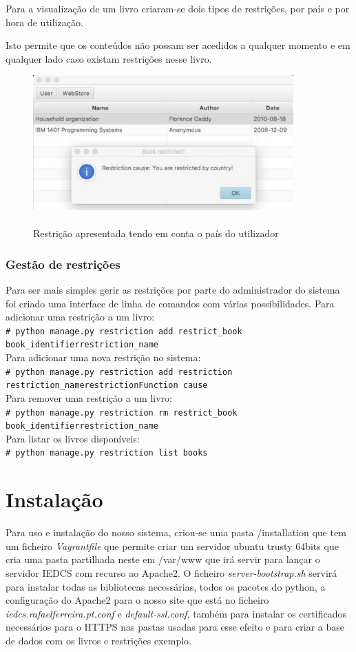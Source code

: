 \documentclass[pdftex,12pt,a4paper]{report}
\newcommand{\shellcmd}[1]{\\\indent\indent\texttt{\footnotesize\# #1}\\}
\begin{document}
Para a visualização de um livro criaram-se dois tipos de restrições, por país e por hora de utilização.

Isto permite que os conteúdos não possam ser acedidos a qualquer momento e em qualquer lado caso existam restrições nesse livro.

\begin{figure}[!htb]
\center
 \includegraphics[width=100mm,scale=1]{country_restriction.pdf}
 \caption{\\Restrição apresentada tendo em conta o país do utilizador}
 \label{fig:eer}
\end{figure}

\subsubsection{Gestão de restrições}

Para ser mais simples gerir as restrições por parte do administrador do sistema foi criado uma interface de linha de comandos com várias possibilidades. 
Para adicionar uma restrição a um livro:
\shellcmd{python manage.py restriction add restrict{\_}book book{\_}identifier\linebreak restriction{\_}name}
Para adicionar uma nova restrição no sistema:
\shellcmd{python manage.py restriction add restriction restriction{\_}name\linebreak restrictionFunction cause}
Para remover uma restrição a um livro:
\shellcmd{python manage.py restriction rm restrict{\_}book book{\_}identifier\linebreak restriction{\_}name}
Para listar os livros disponíveis:
\shellcmd{python manage.py restriction list books}

\section{Instalação}

Para uso e instalação do nosso sistema, criou-se uma pasta /installation que tem um ficheiro \textit{Vagrantfile} que permite criar um servidor ubuntu trusty 64bits que cria uma pasta partilhada neste em /var/www que irá servir para lançar o servidor IEDCS com recurso ao Apache2. O ficheiro \textit{server-bootstrap.sh} servirá para instalar todas as bibliotecas necessárias, todos os pacotes do python, a configuração do Apache2 para o nosso site que está no ficheiro \textit{iedcs.rafaelferreira.pt.conf} e \textit{default-ssl.conf}, também para instalar os certificados necessários para o HTTPS nas pastas usadas para esse efeito e para criar a base de dados com os livros e restrições exemplo.
	
\end{document}
